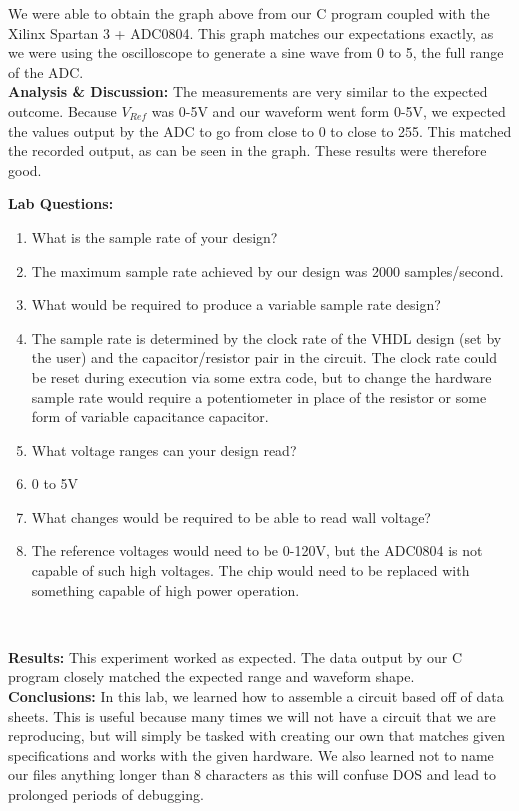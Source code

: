 \documentclass{article}
\newcommand{\Q}{\textbf{Q:}}
\newcommand{\A}{\textbf{A:}}
\newcommand{\sect}[1]{\noindent\textbf{#1}}
\begin{document}
We were able to obtain the graph above from our C program coupled with the Xilinx Spartan 3 + ADC0804. This graph matches our expectations exactly, as we were using the oscilloscope to generate a sine wave from 0 to 5, the full range of the ADC. \\

\sect{Analysis \& Discussion:} The measurements are very similar to the expected outcome. Because $V_{Ref}$ was 0-5V and our waveform went form 0-5V, we expected the values output by the ADC to go from close to 0 to close to 255. This matched the recorded output, as can be seen in the graph. These results were therefore good.

\sect{Lab Questions:}

\begin{enumerate}
	\item[\Q] What is the sample rate of your design?
	\item[\A] The maximum sample rate achieved by our design was 2000 samples/second.
	\item[\Q] What would be required to produce a variable sample rate design?
	\item[\A] The sample rate is determined by the clock rate of the VHDL design (set by the user) and the capacitor/resistor pair in the circuit. The clock rate could be reset during execution via some extra code, but to change the hardware sample rate would require a potentiometer in place of the resistor or some form of variable capacitance capacitor.
	\item[\Q] What voltage ranges can your design read?
	\item[\A] 0 to 5V
	\item[\Q] What changes would be required to be able to read wall voltage?
	\item[\A] The reference voltages would need to be 0-120V, but the ADC0804 is not capable of such high voltages. The chip would need to be replaced with something capable of high power operation.
\end{enumerate}~

\sect{Results:} This experiment worked as expected. The data output by our C program closely matched the expected range and waveform shape. \\

\sect{Conclusions:} In this lab, we learned how to assemble a circuit based off of data sheets. This is useful because many times we will not have a circuit that we are reproducing, but will simply be tasked with creating our own that matches given specifications and works with the given hardware. We also learned not to name our files anything longer than 8 characters as this will confuse DOS and lead to prolonged periods of debugging.
\end{document}
